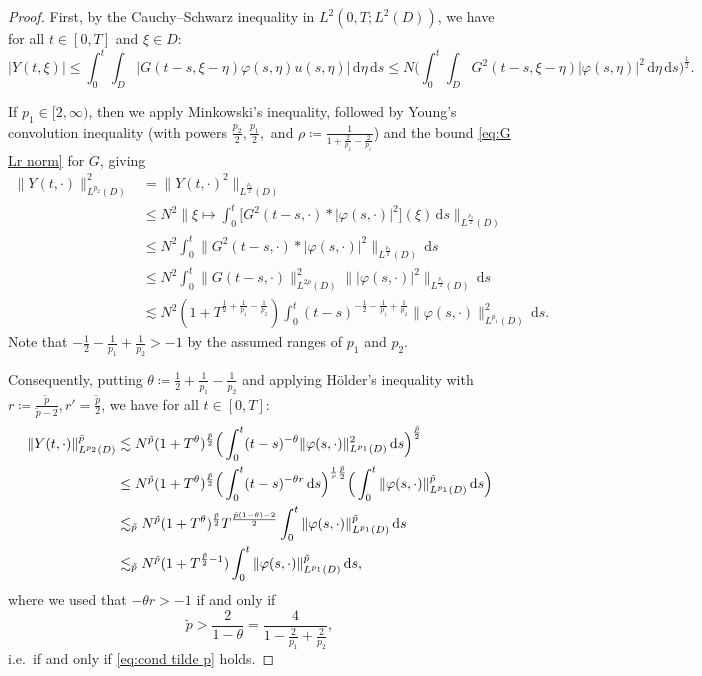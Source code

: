 \documentclass{amsart}
\theoremstyle{plain}
\theoremstyle{remark}
\theoremstyle{plain}
\numberwithin{equation}{section}
\newcommand{\ceqq}{\coloneqq}
\newcommand{\dd}{\,\mathrm{d}}
\begin{document}
\begin{proof}

First, by the Cauchy--Schwarz inequality in $L^2(0,T;L^2(D))$, we have for all $t\in[0,T]$ and $\xi\in D$:
\[
|Y(t,\xi)|\leq\int_0^t \int_D |G(t-s,\xi-\eta)\varphi(s,\eta)u(s,\eta)|\dd\eta \dd s
\leq N\Big(\int_0^t \int_D G^2(t-s,\xi-\eta)|\varphi(s,\eta)|^2\dd\eta \dd s\Big)^{\frac12}.
\]

If $p_1\in[2,\infty)$, then we apply Minkowski's inequality, followed by Young's convolution inequality (with powers $\frac{p_2}{2}, \frac{p_1}{2},$ and 
$\rho\ceqq \frac{1}{1+\frac{2}{p_2}-\frac{2}{p_1}}$) and the bound \eqref{eq:G Lr norm} for $G$, giving
\begin{align*}
   \|Y(t,\cdot)\|_{L^{p_2}(D)}^2  &=\|Y(t,\cdot)^2\|_{L^{\frac{p_2}{2}}(D)}\\
   &\leq N^2 \Big\|\xi\mapsto\int_0^t  \big[G^2(t-s,\cdot)*|\varphi(s,\cdot)|^2\big](\xi)  \dd s\Big\|_{L^{\frac{p_2}{2}}(D)} \\
   &\leq N^2  \int_0^t \|G^2(t-s,\cdot)*|\varphi(s,\cdot)|^2\|_{L^{\frac{p_2}{2}}(D)}\dd s \\
   &\leq  N^2 \int_0^t   \|G(t-s,\cdot)\|_{L^{2\rho}(D)}^2\||\varphi(s,\cdot)|^2\|_{L^{\frac{p_1}{2}}(D)}\dd s\\ 
   &\lesssim N^2 (1+T^{\frac12+\frac{1}{p_1}-\frac{1}{p_2}}) \int_0^t (t-s)^{-\frac12-\frac{1}{p_1}+\frac{1}{p_2}} \|\varphi(s,\cdot)\|_{L^{p_1}(D)}^{2 } \dd s. 
\end{align*} 
Note that $-\frac12-\frac{1}{p_1}+\frac{1}{p_2}>-1$ by the assumed ranges of $p_1$ and $p_2$. 

Consequently, putting $\theta\ceqq \frac12+\frac{1}{p_1}-\frac{1}{p_2}$ and applying H\"older's inequality with $r\ceqq \frac{\tilde p}{\tilde p-2}, r'=\frac{\tilde p}{2}$, we have  for all  $t\in[0,T]$:
\begin{align}
  \|Y(t,\cdot)\|_{L^{p_2}(D)}^{{\tilde p}}   
&\lesssim N^{{\tilde p}}(1+T^{\theta})^{\frac{\tilde p}{2}} \Big(\int_0^t(t-s)^{-\theta}\|\varphi(s,\cdot)\|_{L^{p_1}(D)}^2\dd s\Big)^{\frac{\tilde p}{2}} \notag\\ 
  &\leq N^{{\tilde p}}(1+T^{\theta})^{\frac{\tilde p}{2}} \Big(\int_0^t(t-s)^{-\theta r}\dd s\Big)^{\frac{1}{r}\frac{\tilde p}{2}} \Big(\int_0^t\|\varphi(s,\cdot)\|_{L^{p_1}(D)}^{\tilde p}\dd s\Big)  \notag\\ 
 &\lesssim_{{\tilde p}} N^{{\tilde p}}(1+T^{\theta})^{\frac{\tilde p}{2}}T^{\frac{\tilde p(1-\theta)-2}{2}}\int_0^t\|\varphi(s,\cdot)\|_{L^{p_1}(D)}^{{\tilde p}}\dd s\notag\\
 &\lesssim_{\tilde p} N^{{\tilde p}}(1+T^{\frac{\tilde p}{2}-1})\int_0^t\|\varphi(s,\cdot)\|_{L^{p_1}(D)}^{{\tilde p}}\dd s, \label{eq:Yestreg}
\end{align} 
where we used that $- \theta r>-1$ if and only if  
$$
\tilde p>\frac{2}{1-\theta}=\frac{4}{1-\frac{2}{p_1}+\frac{2}{p_2}},
$$
i.e.\ if and only if \eqref{eq:cond tilde p} holds. 


\end{proof}
\end{document}
